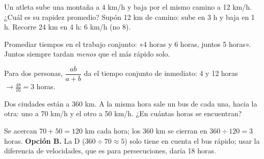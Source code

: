 \begin{ejemplo}
Un atleta sube una montaña a 4 km/h y baja por el mismo camino a 12 km/h. ¿Cuál es su rapidez promedio?
\solucion Supón 12 km de camino: sube en 3 h y baja en 1 h. Recorre 24 km en 4 h: 6 km/h (no 8).
\end{ejemplo}

\begin{trampa}
Promediar tiempos en el trabajo conjunto: «4 horas y 6 horas, juntos 5 horas». Juntos siempre tardan \emph{menos} que el
más rápido solo.
\end{trampa}

\begin{atajo}
Para dos personas, $\dfrac{ab}{a + b}$ da el tiempo conjunto de inmediato: 4 y 12 horas $\to \tfrac{48}{16} = 3$ horas.
\end{atajo}

\begin{reto}
Dos ciudades están a 360 km. A la misma hora sale un bus de cada una, hacia la otra: uno a 70 km/h y el otro a 50 km/h.
¿En cuántas horas se encuentran?
\end{reto}

\begin{retoresuelto}
Se acercan $70 + 50 = 120$ km cada hora; los 360 km se cierran en $360 \div 120 = 3$ horas. \textbf{Opción B.} La D ($360 \div 70 \approx 5$) solo tiene en cuenta el bus rápido; usar la diferencia de velocidades, que es para persecuciones, daría 18 horas.
\end{retoresuelto}

